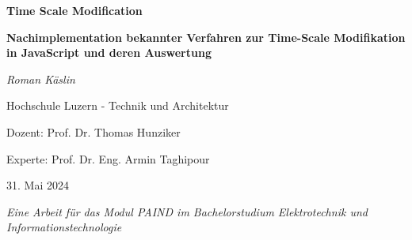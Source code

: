 \begin{titlepage}
    \centering
    
    {\Huge\bfseries Time Scale Modification\par}
    \vspace{1.5cm}
    
    {\Large\bfseries Nachimplementation bekannter Verfahren zur Time-Scale Modifikation in JavaScript und deren Auswertung\par}
    \vspace{1.5cm}
    
    {\large\textit{Roman Käslin}\par}
    \vspace{0.5cm}
    
    {\large Hochschule Luzern - Technik und Architektur\par}
    \vspace{1cm}

    {\large Dozent: Prof. Dr. Thomas Hunziker \par}
    {\large Experte: Prof. Dr. Eng. Armin Taghipour\par}
    \vspace{1.5cm}
    

    {\large 31. Mai 2024\par}
    \vfill
    
    {\large \textit{Eine Arbeit für das Modul PAIND im Bachelorstudium Elektrotechnik und Informationstechnologie}\par}
\end{titlepage}
